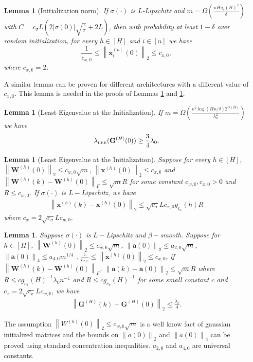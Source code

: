 \documentclass[11pt]{article}
\theoremstyle{plain}
\newtheorem{lemma}[thm]{Lemma}
\theoremstyle{definition}
\newcommand{\norm}[1]{\left\| #1 \right\|}
\newcommand{\abs}[1]{\left| #1 \right|}
\begin{document}
\begin{lemma}[Initialization norm] If $\sigma(\cdot)$ is $L$-Lipschitz and $m= \Omega\left(\frac{nHg_c(H)^2}{\delta}\right)$ with $C = c_\sigma L(2\abs{\sigma(0)} \sqrt{\frac{2}{\pi}}+2L)$, then with probability at least $1-\delta$ over random initialization, for every $h \in [H]$ and $i \in [n]$ we have
\[
\frac{1}{c_{x, 0}} \leq\left\|\mathbf{x}_{i}^{(h)}(0)\right\|_{2} \leq c_{x, 0},
\]
where $c_{x,0}=2$. 
\end{lemma}   
A similar lemma can be proven for different architectures with a different value of $c_{x,0}$. This lemma is needed in the proofs of Lemmas \ref{lemma:activations_stability} and \ref{lemma:eigenvalue_stability_while_training}.

\begin{lemma}[Least Eigenvalue at the Initialization] If $m= \Omega\left(\frac{n^2\log(Hn/\delta)2^{O(H)}}{\lambda_0^2}\right)$ we have
\[
    \lambda_{\textup{min}}(\mathbf{G}^{(H)}(0)) \geq \frac{3}{4}\lambda_0.
\]
\end{lemma}

\begin{lemma}[Least Eigenvalue at the Initialization]\label{lemma:activations_stability}
	Suppose for every $h\in[H]$, $\norm{\mathbf{W}^{(h)}(0)}_2 \le c_{w,0}\sqrt{m}$, $\norm{\mathbf{x}^{(h)}(0)}_2 \le c_{x,0}$ and $\norm{\mathbf{W}^{(h)}(k)-\mathbf{W}^{(h)}(0)}_F \le \sqrt{m} R$ for some constant $c_{w,0},c_{x,0} > 0$ and $R \le c_{w,0}$.
	If $\sigma(\cdot)$ is $L-$Lipschitz, we have \begin{align*}
	\norm{\mathbf{x}^{(h)}(k)-\mathbf{x}^{(h)}(0)}_2 \le \sqrt{c_{\sigma}}Lc_{x,0}g_{c_x}(h)R
	\end{align*} where $c_x=2\sqrt{c_{\sigma}}Lc_{w,0}$.
\end{lemma}

\begin{lemma} \label{lemma:eigenvalue_stability_while_training}    	Suppose $\sigma(\cdot)$ is $L-$Lipschitz and $\beta-$smooth. Suppose for $h\in[H]$, $\norm{\mathbf{W}^{(h)}(0)}_2\le c_{w,0}\sqrt{m}$, $\norm{\mathbf{a}(0)}_2\le a_{2,0}\sqrt{m}$, $\norm{\mathbf{a}(0)}_4\le a_{4,0}m^{1/4}$ , $\frac{1}{c_{x,0}}\le\norm{\mathbf{x}^{(h)}(0)}_2 \le c_{x,0}$,  if $\norm{\mathbf{W}^{(h)}(k)-\mathbf{W}^{(h)}(0)}_F$, $\norm{\mathbf{a}(k)-\mathbf{a}(0)}_2 \le \sqrt{m}R$ where $R \le c g_{c_x}(H)^{-1}\lambda_0n^{-1}$ and $R\le c g_{c_x}(H)^{-1}$ for some small constant $c$ and $c_x = 2\sqrt{c_{\sigma}}Lc_{w,0}$, we have \begin{align*}
	\norm{\mathbf{G}^{(H)}(k) - \mathbf{G}^{(H)}(0)}_2 \le \frac{\lambda_0}{4}.
	\end{align*}
\end{lemma}
The assumption $\norm{W^{(h)}(0)}_2 \leq c_{w,0}\sqrt{m}$ is a well know fact of gaussian initialized matrices and the bounds on $\norm{a(0)}_2$ and $\norm{a(0)}_4$ can be proved using standard concentration inequalities. $a_{2,0}$ and $a_{4,0}$ are universal constants.
\end{document}
